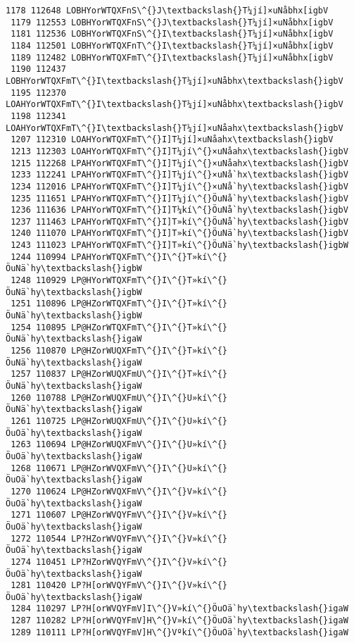\documentclass[11pt]{article}
\begin{document}
\begin{Verbatim}[commandchars=\\\{\}]
 1178 112648 LOBHYorWTQXFnS\^{}J\textbackslash{}T¼jí]×uNåbhx[igbV
 1179 112553 LOBHYorWTQXFnS\^{}J\textbackslash{}T¼jí]×uNåbhx[igbV
 1181 112536 LOBHYorWTQXFnS\^{}I\textbackslash{}T¼jí]×uNåbhx[igbV
 1184 112501 LOBHYorWTQXFnT\^{}I\textbackslash{}T¼jí]×uNåbhx[igbV
 1189 112482 LOBHYorWTQXFmT\^{}I\textbackslash{}T¼jí]×uNåbhx[igbV
 1190 112437 LOBHYorWTQXFmT\^{}I\textbackslash{}T¼jí]×uNåbhx\textbackslash{}igbV
 1195 112370 LOAHYorWTQXFmT\^{}I\textbackslash{}T¼jí]×uNåbhx\textbackslash{}igbV
 1198 112341 LOAHYorWTQXFmT\^{}I\textbackslash{}T¼jí]×uNåahx\textbackslash{}igbV
 1207 112310 LOAHYorWTQXFmT\^{}I]T¼jí]×uNåahx\textbackslash{}igbV
 1213 112303 LOAHYorWTQXFmT\^{}I]T¼jí\^{}×uNåahx\textbackslash{}igbV
 1215 112268 LPAHYorWTQXFmT\^{}I]T¼jí\^{}×uNåahx\textbackslash{}igbV
 1233 112241 LPAHYorWTQXFmT\^{}I]T¼jí\^{}×uNå`hx\textbackslash{}igbV
 1234 112016 LPAHYorWTQXFmT\^{}I]T¼jí\^{}×uNå`hy\textbackslash{}igbV
 1235 111651 LPAHYorWTQXFmT\^{}I]T¼jí\^{}ÖuNå`hy\textbackslash{}igbV
 1236 111636 LPAHYorWTQXFmT\^{}I]T¼kí\^{}ÖuNå`hy\textbackslash{}igbV
 1237 111463 LPAHYorWTQXFmT\^{}I]T»kí\^{}ÖuNå`hy\textbackslash{}igbV
 1240 111070 LPAHYorWTQXFmT\^{}I]T»kí\^{}ÖuNä`hy\textbackslash{}igbV
 1243 111023 LPAHYorWTQXFmT\^{}I]T»kí\^{}ÖuNä`hy\textbackslash{}igbW
 1244 110994 LPAHYorWTQXFmT\^{}I\^{}T»kí\^{}ÖuNä`hy\textbackslash{}igbW
 1248 110929 LP@HYorWTQXFmT\^{}I\^{}T»kí\^{}ÖuNä`hy\textbackslash{}igbW
 1251 110896 LP@HZorWTQXFmT\^{}I\^{}T»kí\^{}ÖuNä`hy\textbackslash{}igbW
 1254 110895 LP@HZorWTQXFmT\^{}I\^{}T»kí\^{}ÖuNä`hy\textbackslash{}igaW
 1256 110870 LP@HZorWUQXFmT\^{}I\^{}T»kí\^{}ÖuNä`hy\textbackslash{}igaW
 1257 110837 LP@HZorWUQXFmU\^{}I\^{}T»kí\^{}ÖuNä`hy\textbackslash{}igaW
 1260 110788 LP@HZorWUQXFmU\^{}I\^{}U»kí\^{}ÖuNä`hy\textbackslash{}igaW
 1261 110725 LP@HZorWUQXFmU\^{}I\^{}U»kí\^{}ÖuOä`hy\textbackslash{}igaW
 1263 110694 LP@HZorWUQXFmV\^{}I\^{}U»kí\^{}ÖuOä`hy\textbackslash{}igaW
 1268 110671 LP@HZorWVQXFmV\^{}I\^{}U»kí\^{}ÖuOä`hy\textbackslash{}igaW
 1270 110624 LP@HZorWVQXFmV\^{}I\^{}V»kí\^{}ÖuOä`hy\textbackslash{}igaW
 1271 110607 LP@HZorWVQYFmV\^{}I\^{}V»kí\^{}ÖuOä`hy\textbackslash{}igaW
 1272 110544 LP?HZorWVQYFmV\^{}I\^{}V»kí\^{}ÖuOä`hy\textbackslash{}igaW
 1274 110451 LP?HZorWVQYFmV\^{}I\^{}V»kí\^{}ÖuOä`hy\textbackslash{}igaW
 1281 110420 LP?H[orWVQYFmV\^{}I\^{}V»kí\^{}ÖuOä`hy\textbackslash{}igaW
 1284 110297 LP?H[orWVQYFmV]I\^{}V»kí\^{}ÖuOä`hy\textbackslash{}igaW
 1287 110282 LP?H[orWVQYFmV]H\^{}V»kí\^{}ÖuOä`hy\textbackslash{}igaW
 1289 110111 LP?H[orWVQYFmV]H\^{}Vºkí\^{}ÖuOä`hy\textbackslash{}igaW

\end{Verbatim}
\end{document}
